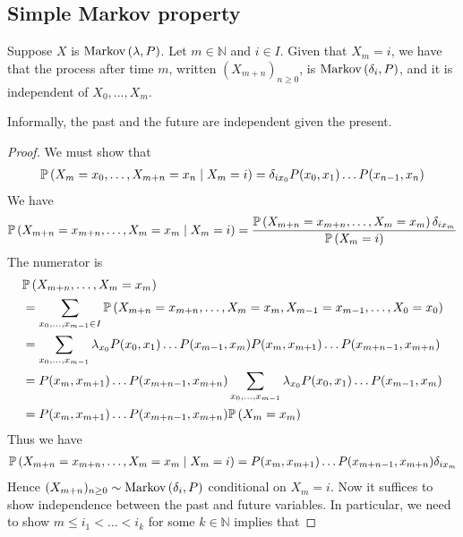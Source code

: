 \subsection{Simple Markov property}
\begin{theorem}
	Suppose $X$ is $\operatorname{Markov}\left({\lambda, P}\right)$.
	Let $m \in \mathbb N$ and $i \in I$.
	Given that $X_m = i$, we have that the process after time $m$, written $(X_{m+n})_{n \geq 0}$, is $\operatorname{Markov}\left({\delta_i, P}\right)$, and it is independent of $X_0, \dots, X_m$.
\end{theorem}
\noindent Informally, the past and the future are independent given the present.
\begin{proof}
	We must show that
	\begin{align*}
		\mathbb{P}\left({X_m = x_0, \dots, X_{m+n} = x_n \mid X_m = i}\right) = \delta_{i x_0} P(x_0, x_1) \dots P(x_{n-1}, x_n)
	\end{align*}
	We have
	\begin{align*}
		\mathbb{P}\left({X_{m+n} = x_{m+n}, \dots, X_m = x_m \mid X_m = i}\right)
		= \frac{\mathbb{P}\left({X_{m+n} = x_{m+n}, \dots, X_m = x_m}\right) \delta_{i x_m}}{\mathbb{P}\left({X_m = i}\right)}
	\end{align*}
	The numerator is
	\begin{align*}
		 & \mathbb{P}\left({X_{m+n}, \dots, X_m = x_m}\right)                                                                                         \\ & = \sum_{x_0, \dots, x_{m-1} \in I} \mathbb{P}\left({X_{m+n} = x_{m+n}, \dots, X_m = x_m, X_{m-1} = x_{m-1}, \dots, X_0 = x_0}\right)       \\
		 & = \sum_{x_0, \dots, x_{m-1}} \lambda_{x_0} P(x_0, x_1) \dots P(x_{m-1}, x_m) P(x_m, x_{m+1}) \dots P(x_{m+n-1}, x_{m+n}) \\
		 & = P(x_m, x_{m+1}) \dots P(x_{m+n-1}, x_{m+n}) \sum_{x_0, \dots, x_{m-1}} \lambda_{x_0} P(x_0, x_1) \dots P(x_{m-1}, x_m) \\
		 & = P(x_m, x_{m+1}) \dots P(x_{m+n-1}, x_{m+n}) \mathbb{P}\left({X_m = x_m}\right)                                                           \\
	\end{align*}
	Thus we have
	\begin{align*}
		\mathbb{P}\left({X_{m+n} = x_{m+n}, \dots, X_m = x_m \mid X_m = i}\right)
		= P(x_m, x_{m+1}) \dots P(x_{m+n-1}, x_{m+n}) \delta_{i x_m}
	\end{align*}
	Hence $(X_{m+n})_{n \geq 0} \sim \operatorname{Markov}\left({\delta_i, P}\right)$ conditional on $X_m = i$.
	Now it suffices to show independence between the past and future variables.
	In particular, we need to show $m \leq i_1 < \dots < i_k$ for some $k \in \mathbb N$ implies that

\end{proof}
